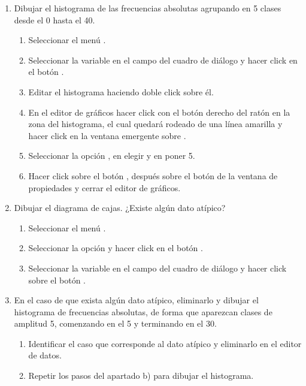 \begin{enumerate}[leftmargin=*]
\begin{enumerate}
\item  Dibujar el histograma de las frecuencias absolutas agrupando en 5 clases desde el 0 hasta el 40.
\begin{indicacion}
\begin{enumerate}
\item Seleccionar el menú .
\item Seleccionar la variable  en el campo  del cuadro de diálogo y hacer click en el botón
.
\item Editar el histograma haciendo doble click sobre él.
\item En el editor de gráficos hacer click con el botón derecho del ratón 
en la zona del histograma, el cual quedará rodeado de una línea amarilla 
y hacer click en la ventana emergente sobre .  
\item Seleccionar la opción , en  elegir  y en 
poner 5. 
\item Hacer click sobre el botón , después sobre el botón  de la ventana de propiedades y cerrar el editor de
gráficos.
\end{enumerate}
\end{indicacion}

\item  Dibujar el diagrama de cajas. ¿Existe algún dato atípico?
\begin{indicacion}
\begin{enumerate}
\item Seleccionar el menú .
\item Seleccionar la opción  y hacer click en el botón .
\item Seleccionar la variable  en el campo  del cuadro de diálogo y hacer click sobre el botón .
\end{enumerate}
\end{indicacion}

\item  En el caso de que exista algún dato atípico, eliminarlo y dibujar el histograma de frecuencias absolutas, de forma que aparezcan clases de amplitud 5, comenzando en el 5 y terminando en el 30.
\begin{indicacion}
\begin{enumerate}
\item Identificar el caso que corresponde al dato atípico y eliminarlo en el editor de datos. 
\item Repetir los pasos del apartado b) para dibujar el histograma.
\end{enumerate}
\end{indicacion}
\end{enumerate}

\end{enumerate}


